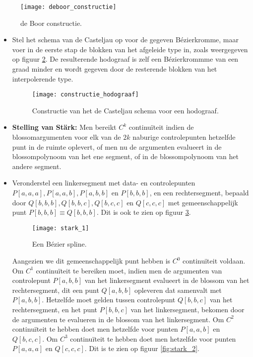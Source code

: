\begin{itemize}
{\begin{itemize}
			\begin{figure}[ht]
				\centering
				\texttt{[image: deboor\_constructie]}
				\caption{de Boor constructie.}
				\label{fig:deboor_constructie}
			\end{figure}
		\end{itemize}
		}
	{
		\begin{itemize}
			\item Stel het schema van de Casteljau op voor de gegeven Bézierkromme, maar voer in de eerste stap de blokken van het afgeleide type in, zoals weergegeven op figuur \ref{fig:constructie_hodograaf}. De resulterende hodograaf is zelf een Bézierkrommme van een graad minder en wordt gegeven door de resterende blokken van het interpolerende type.
			\begin{figure}[ht]
				\centering
				\texttt{[image: constructie\_hodograaf]}	
				\caption{Constructie van het de Casteljau schema voor een hodograaf.}
				\label{fig:constructie_hodograaf}
			\end{figure}
		\end{itemize}
		
	}
	{
		\begin{itemize} 
		\item \textbf{Stelling van Stärk:} Men bereikt $C^k$ continuïteit indien de blossomargumenten voor elk van de $2k$ naburige controlepunten hetzelfde punt in de ruimte oplevert, of men nu de argumenten evalueert in de blossompolynoom van het ene segment, of in de blossompolynoom van het andere segment. 
		\item Veronderstel een linkersegment met data- en controlepunten $P[a, a, a], P[a, a, b], P[a, b, b]$ en $P[b, b, b]$, en een rechtersegment, bepaald door $Q[b, b, b], Q[b, b, c], Q[b, c, c]$ en $Q[c, c, c]$ met gemeenschappelijk punt $P[b, b, b] \equiv Q[b, b, b]$. Dit is ook te zien op figuur \ref{fig:stark_1}.
		\begin{figure}[ht]
			\centering
			\texttt{[image: stark\_1]}
			\caption{Een Bézier spline.}
			\label{fig:stark_1}
		\end{figure}
		
		Aangezien we dit gemeenschappelijk punt hebben is $C^0$ continuïteit voldaan. Om $C^1$ continuïteit te bereiken moet, indien men de argumenten van controlepunt $P[a, b, b]$ van het linkersegment evalueert in de blossom van het rechtersegment, dit een punt $Q[a, b, b]$ opleveren dat samenvalt met $P[a, b, b]$. Hetzelfde moet gelden tussen controlepunt $Q[b,b,c]$ van het rechtersegment, en het punt $P[b,b,c]$ van het linkersegment, bekomen door de argumenten te evalueren in de blossom van het linkersegment. Om $C^2$ continuïteit te hebben doet men hetzelfde voor punten $P[a,a,b]$ en $Q[b,c,c]$. Om $C^3$ continuïteit te hebben doet men hetzelfde voor punten $P[a,a,a]$ en $Q[c,c,c]$. Dit is te zien op figuur \ref{fig:stark_2}.


\end{itemize}}
\end{itemize}
